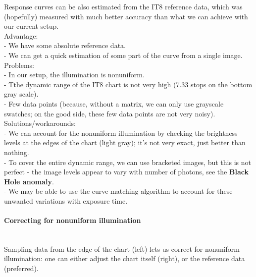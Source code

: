 Response curves can be also estimated from the IT8 reference data, which was (hopefully) measured with much better accuracy than what we can achieve with our current setup.\\

Advantage:\\

- We have some absolute reference data.\\
- We can get a quick estimation of some part of the curve from a single image.\\ 

Problems:\\

- In our setup, the illumination is nonuniform.\\
- Tthe dynamic range of the IT8 chart is not very high (7.33 stops on the bottom gray scale).\\
- Few data points (because, without a matrix, we can only use grayscale swatches; on the good side, these few data points are not very noisy).\\ 

Solutions/workarounds:\\

- We can account for the nonuniform illumination by checking the brightness levels at the edges of the chart (light gray); it's not very exact, just better than nothing.\\
- To cover the entire dynamic range, we can use bracketed images, but this is not perfect - the image levels appear to vary with number of photons, see the \textbf{Black Hole anomaly}.\\
- We may be able to use the curve matching algorithm to account for these unwanted variations with exposure time.\\

 
\paragraph{Correcting for nonuniform illumination}\mbox{}\\

Sampling data from the edge of the chart (left) lets us correct for nonuniform illumination: one can either adjust the chart itself (right), or the reference data (preferred).\\


